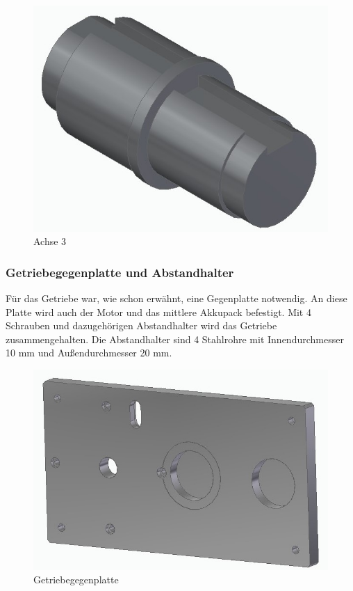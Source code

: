 \begin{figure} [H]
	\begin{center}
		\includegraphics[scale=0.5]{figures/mechanik/Achse_mit_nuten.jpg}
			\caption{Achse 3}
			\label{fig:Achse 3}
	\end{center}
\end{figure}

\subsubsection*{Getriebegegenplatte und Abstandhalter}

Für das Getriebe war, wie schon erwähnt, eine Gegenplatte notwendig. An diese Platte wird auch der Motor und das mittlere Akkupack befestigt. Mit 4 Schrauben und dazugehörigen Abstandhalter wird das Getriebe zusammengehalten. Die Abstandhalter sind 4 Stahlrohre mit Innendurchmesser 10 mm und Außendurchmesser 20 mm.

\begin{figure} [H]
	\begin{center}
		\includegraphics[scale=0.5]{figures/mechanik/Aufbau_Seitenplatte_Links.jpg}
			\caption{Getriebegegenplatte}
			\label{Getriebegegenplatte}
	\end{center}
\end{figure}

